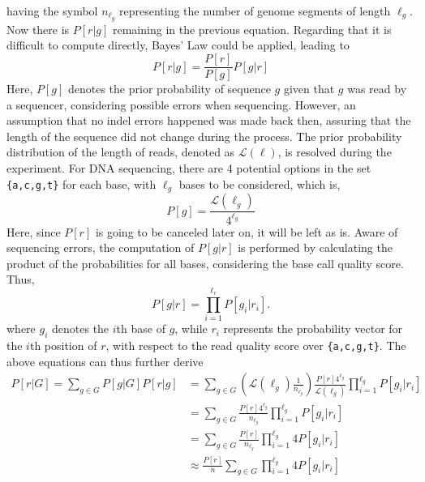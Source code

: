\documentclass{PHlab-thesis}
\begin{document}
having the symbol $n_{\ell_g}$ representing the number of genome segments of length $\ell_g$.
Now there is $P[r|g]$ remaining in the previous equation. Regarding that it is difficult to compute directly, Bayes' Law could be applied, leading to
\begin{equation}
P[r|g] = \frac{P[r]}{P[g]} P[g|r]
\end{equation}
Here, $P[g]$ denotes the prior probability of sequence $g$ given that $g$ was read by a sequencer, considering possible errors when sequencing. However, an assumption that no indel errors happened was made back then, assuring that the length of the sequence did not change during the process. The prior probability distribution of the length of reads, denoted as $\mathcal{L}(\ell)$, is resolved during the experiment. For DNA sequencing, there are 4 potential options in the set \texttt{\{a,c,g,t\}} for each base, with $\ell_g$ bases to be considered, which is,
\begin{equation}
P[g] =  \frac{\mathcal{L}(\ell_g)}{4^{\ell_g}}
\end{equation}
Here, since $P[r]$ is going to be canceled later on, it will be left as is. Aware of sequencing errors, the computation of $P[g|r]$ is performed by calculating the product of the probabilities for all bases, considering the base call quality score. Thus,
\begin{equation}
P[g|r] = \prod_{i=1}^{\ell_r} P[g_i|r_i].
\end{equation}
where $g_i$ denotes the $i$th base of $g$, while $r_i$ represents the probability vector for the $i$th position of $r$, with respect to the read quality score over \texttt{\{a,c,g,t\}}. The above equations can thus further derive
\begin{equation*}
\begin{split}
P[r|G] =  \sum_{g\in G} P[g|G] P[r|g] &= \sum_{g\in G} \left( \mathcal{L}(\ell_g) \frac{1}{n_{\ell_g}} \right) \frac{P[r]4^{\ell_g}}{\mathcal{L}(\ell_g)} \prod_{i=1}^{\ell_g} P[g_i|r_i]  \\
                                      &= \sum_{g\in G} \frac{P[r]4^{\ell_g}}{n_{\ell_g}} \prod_{i=1}^{\ell_g} P[g_i|r_i]  \\
                                      &= \sum_{g\in G} \frac{P[r]}{n_{\ell_g}} \prod_{i=1}^{\ell_g} 4P[g_i|r_i]  \\
                                      &\approx \frac{P[r]}{n} \sum_{g\in G} \prod_{i=1}^{\ell_g} 4P[g_i|r_i]  \\
\end{split}
\end{equation*}
\end{document}
